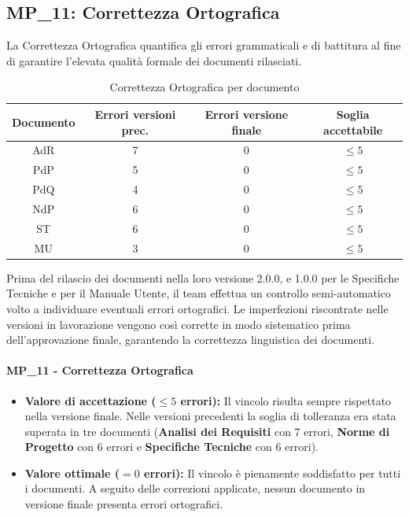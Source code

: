 \documentclass[12pt, a4paper]{article}
\begin{document}
\subsection{MP\_11: Correttezza Ortografica}
La Correttezza Ortografica quantifica gli errori grammaticali e di battitura al fine di garantire l'elevata qualità formale dei documenti rilasciati.

\begin{table}[htbp]
    \centering
    \renewcommand{\arraystretch}{1.3}
    \begin{tabular}{|c|c|c|c|}
        \hline
        \textbf{Documento} & \textbf{Errori versioni prec.} & \textbf{Errori versione finale} & \textbf{Soglia accettabile} \\ \hline
        AdR & 7 & 0 & $\leq 5$ \\ \hline
        PdP & 5 & 0 & $\leq 5$ \\ \hline
        PdQ & 4 & 0 & $\leq 5$ \\ \hline
        NdP & 6 & 0 & $\leq 5$ \\ \hline
        ST & 6 & 0 & $\leq 5$ \\ \hline
        MU & 3 & 0 & $\leq 5$ \\ \hline
    \end{tabular}
    \caption{Correttezza Ortografica per documento}
    \label{tab:errori_documento}
\end{table}

Prima del rilascio dei documenti nella loro versione 2.0.0, e 1.0.0 per le Specifiche Tecniche e per il Manuale Utente, il team effettua un controllo semi-automatico volto a individuare eventuali errori ortografici. Le imperfezioni riscontrate nelle versioni in lavorazione vengono così corrette in modo sistematico prima dell'approvazione finale, garantendo la correttezza linguistica dei documenti.

\paragraph*{MP\_11 - Correttezza Ortografica}
\begin{itemize}
    \item \textbf{Valore di accettazione ($\le 5$ errori):} Il vincolo risulta sempre rispettato nella versione finale. Nelle versioni precedenti la soglia di tolleranza era stata superata in tre documenti (\textbf{Analisi dei Requisiti} con 7 errori, \textbf{Norme di Progetto} con 6 errori e \textbf{Specifiche Tecniche} con 6 errori).
    \item \textbf{Valore ottimale ($= 0$ errori):} Il vincolo è pienamente soddisfatto per tutti i documenti. A seguito delle correzioni applicate, nessun documento in versione finale presenta errori ortografici.
\end{itemize}
\end{document}
